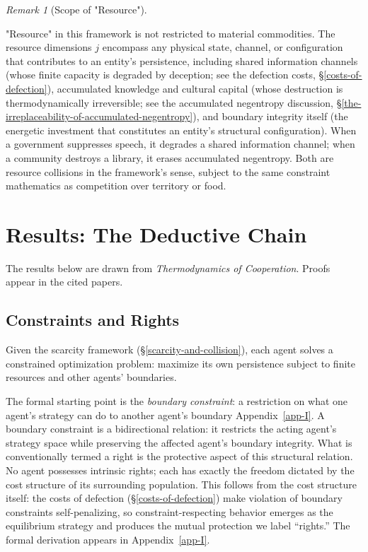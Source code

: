 \documentclass[11pt]{article}
\theoremstyle{plain}
\theoremstyle{definition}
\theoremstyle{remark}
\newtheorem{remark}{Remark}
\let\origsection\section
\renewcommand{\section}{\needspace{12\baselineskip}\origsection}
\let\origsubsection\subsection
\renewcommand{\subsection}{\needspace{7\baselineskip}\origsubsection}
\begin{document}
\begin{remark}[Scope of "Resource"]
\label{rem-resource-scope}

"Resource" in this framework is not restricted to material commodities. The resource dimensions $j$ encompass any physical state, channel, or configuration that contributes to an entity's persistence, including shared information channels (whose finite capacity is degraded by deception; see the defection costs, §\ref{costs-of-defection}), accumulated knowledge and cultural capital (whose destruction is thermodynamically irreversible; see the accumulated negentropy discussion, §\ref{the-irreplaceability-of-accumulated-negentropy}), and boundary integrity itself (the energetic investment that constitutes an entity's structural configuration). When a government suppresses speech, it degrades a shared information channel; when a community destroys a library, it erases accumulated negentropy. Both are resource collisions in the framework's sense, subject to the same constraint mathematics as competition over territory or food.
\end{remark}

\section{Results: The Deductive
Chain}\label{results-the-deductive-chain}

The results below are drawn from \emph{Thermodynamics of Cooperation}.
Proofs appear in the cited papers.

\subsection{Constraints and Rights}\label{constraints-and-rights}

Given the scarcity framework (§\ref{scarcity-and-collision}), each agent
solves a constrained optimization problem: maximize its own persistence
subject to finite resources and other agents' boundaries.

The formal starting point is the \emph{boundary constraint}: a
restriction on what one agent's strategy can do to another agent's
boundary Appendix~\ref{app-I}. A boundary constraint is a bidirectional
relation: it restricts the acting agent's strategy space while
preserving the affected agent's boundary integrity. What is
conventionally termed a right is the protective aspect of this
structural relation. No agent possesses intrinsic rights; each has
exactly the freedom dictated by the cost structure of its surrounding
population. This follows from the cost structure itself: the costs of
defection (§\ref{costs-of-defection}) make violation of boundary
constraints self-penalizing, so constraint-respecting behavior emerges
as the equilibrium strategy and produces the mutual protection we label
``rights.'' The formal derivation appears in Appendix~\ref{app-I}.
\end{document}
